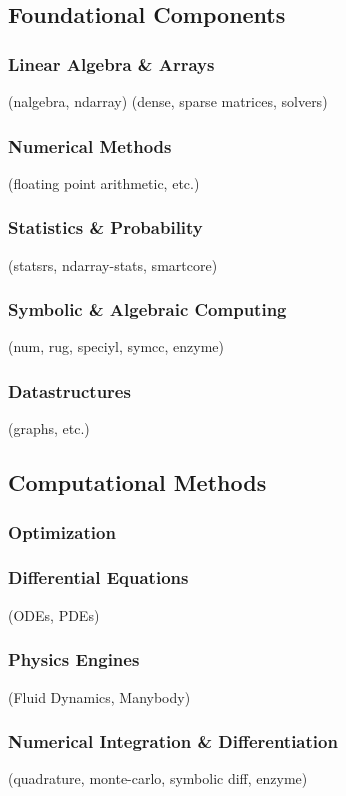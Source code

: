 \documentclass{article}
\begin{document}
\subsection{Foundational Components}
\subsubsection{Linear Algebra \& Arrays}
(nalgebra, ndarray) (dense, sparse matrices, solvers)

\subsubsection{Numerical Methods}
(floating point arithmetic, etc.)

\subsubsection{Statistics \& Probability}
(statsrs, ndarray-stats, smartcore)

\subsubsection{Symbolic \& Algebraic Computing}
(num, rug, speciyl, symcc, enzyme)

\subsubsection{Datastructures}
(graphs, etc.)

\subsection{Computational Methods}
\subsubsection{Optimization}
\subsubsection{Differential Equations}
(ODEs, PDEs)

\subsubsection{Physics Engines}
(Fluid Dynamics, Manybody)

\subsubsection{Numerical Integration \& Differentiation}
(quadrature, monte-carlo, symbolic diff, enzyme)
\end{document}
